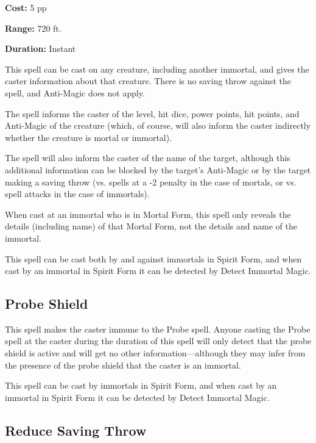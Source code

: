 \begin{multicols*}{2}
{\textbf{Cost:} 5 pp

\textbf{Range:} 720 ft.

\textbf{Duration:} Instant}

This spell can be cast on any creature, including another immortal, and gives the caster information about that creature. There is no saving throw against the spell, and Anti-Magic does not apply.

The spell informs the caster of the level, hit dice, power points, hit points, and Anti-Magic of the creature (which, of course, will also inform the caster indirectly whether the creature is mortal or immortal).

The spell will also inform the caster of the name of the target, although this additional information can be blocked by the target’s Anti-Magic or by the target making a saving throw (vs. spells at a -2 penalty in the case of mortals, or vs. spell attacks in the case of immortals).

When cast at an immortal who is in Mortal Form, this spell only reveals the details (including name) of that Mortal Form, not the details and name of the immortal.

This spell can be cast both by and against immortals in Spirit Form, and when cast by an immortal in Spirit Form it can be detected by Detect Immortal Magic.

\subsection{Probe Shield}

This spell makes the caster immune to the Probe spell. Anyone casting the Probe spell at the caster during the duration of this spell will only detect that the probe shield is active and will get no other information—although they may infer from the presence of the probe shield that the caster is an immortal.

This spell can be cast by immortals in Spirit Form, and when cast by an immortal in Spirit Form it can be detected by Detect Immortal Magic.

\subsection{Reduce Saving Throw}
\end{multicols*}

